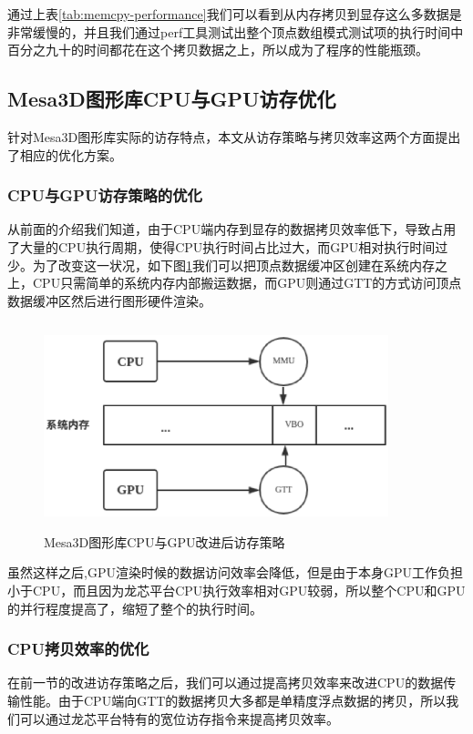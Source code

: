 通过上表\ref{tab:memcpy-performance}我们可以看到从内存拷贝到显存这么多数据是非常缓慢的，并且我们通过perf工具测试出整个顶点数组模式测试项的执行时间中百分之九十的时间都花在这个拷贝数据之上，所以成为了程序的性能瓶颈。

\subsection{Mesa3D图形库CPU与GPU访存优化}

针对Mesa3D图形库实际的访存特点，本文从访存策略与拷贝效率这两个方面提出了相应的优化方案。

\subsubsection{CPU与GPU访存策略的优化}
从前面的介绍我们知道，由于CPU端内存到显存的数据拷贝效率低下，导致占用了大量的CPU执行周期，使得CPU执行时间占比过大，而GPU相对执行时间过少。为了改变这一状况，如下图\ref{fig:vbo-gtt}我们可以把顶点数据缓冲区创建在系统内存之上，CPU只需简单的系统内存内部搬运数据，而GPU则通过GTT的方式访问顶点数据缓冲区然后进行图形硬件渲染。

\begin{figure}[H] 
  \centering
  \includegraphics[width=10cm,height=6cm]{figures/chap03/vbo-gtt}
  \caption{Mesa3D图形库CPU与GPU改进后访存策略}
  \label{fig:vbo-gtt}
\end{figure}

虽然这样之后,GPU渲染时候的数据访问效率会降低，但是由于本身GPU工作负担小于CPU，而且因为龙芯平台CPU执行效率相对GPU较弱，所以整个CPU和GPU的并行程度提高了，缩短了整个的执行时间。

\subsubsection{CPU拷贝效率的优化}

在前一节的改进访存策略之后，我们可以通过提高拷贝效率来改进CPU的数据传输性能。由于CPU端向GTT的数据拷贝大多都是单精度浮点数据的拷贝，所以我们可以通过龙芯平台特有的宽位访存指令来提高拷贝效率。

